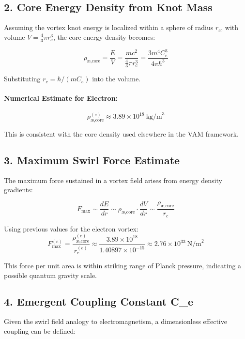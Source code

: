 \subsection{2. Core Energy Density from Knot Mass}

Assuming the vortex knot energy is localized within a sphere of radius $r_c$, with volume $V = \frac{4}{3} \pi r_c^3$, the core energy density becomes:

\begin{equation}
\rho_{\text{\ae,core}} = \frac{E}{V} = \frac{m c^2}{\frac{4}{3} \pi r_c^3} = \frac{3 m^4 C_e^3}{4 \pi \hbar^3}
\end{equation}

Substituting $r_c = \hbar / (m C_e)$ into the volume.


\paragraph{Numerical Estimate for Electron:}
\begin{equation}
\rho_{\text{\ae,core}}^{(e)} \approx 3.89 \times 10^{18} \ \text{kg/m}^3
\end{equation}

This is consistent with the core density used elsewhere in the VAM framework.

\subsection{3. Maximum Swirl Force Estimate}
The maximum force sustained in a vortex field arises from energy density gradients:

\begin{equation}
F_{\max} \sim \frac{dE}{dr} \sim \rho_{\text{\ae,core}} \cdot \frac{dV}{dr} \sim \frac{\rho_{\text{\ae,core}}}{r_c}
\end{equation}

Using previous values for the electron vortex:
\begin{equation}
F_{\max}^{(e)} = \frac{\rho_{\text{\ae,core}}^{(e)}}{r_c^{(e)}} \approx \frac{3.89 \times 10^{18}}{1.40897 \times 10^{-15}} \approx 2.76 \times 10^{33} \ \text{N/m}^2
\end{equation}

This force per unit area is within striking range of Planck pressure, indicating a possible quantum gravity scale.

\subsection{4. Emergent Coupling Constant C_e}
Given the swirl field analogy to electromagnetism, a dimensionless effective coupling can be defined:

